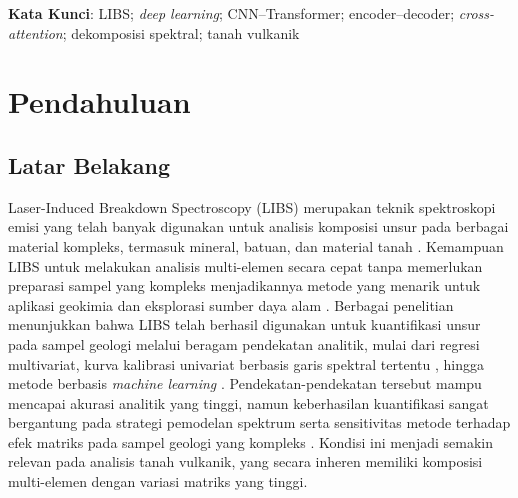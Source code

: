\documentclass[12pt, a4paper]{article}
\begin{document}
\vspace{0.3cm}
\noindent \textbf{Kata Kunci}: LIBS; \textit{deep learning}; CNN–Transformer; encoder–decoder; \textit{cross-attention}; dekomposisi spektral; tanah vulkanik

\newpage
\tableofcontents
\newpage

\section{Pendahuluan}

\subsection{Latar Belakang}
Laser-Induced Breakdown Spectroscopy (LIBS) merupakan teknik spektroskopi emisi yang telah banyak digunakan untuk analisis komposisi unsur pada berbagai material kompleks, termasuk mineral, batuan, dan material tanah \citep{legnaioli2025}. Kemampuan LIBS untuk melakukan analisis multi-elemen secara cepat tanpa memerlukan preparasi sampel yang kompleks menjadikannya metode yang menarik untuk aplikasi geokimia dan eksplorasi sumber daya alam \citep{sawyers2025}. Berbagai penelitian menunjukkan bahwa LIBS telah berhasil digunakan untuk kuantifikasi unsur pada sampel geologi melalui beragam pendekatan analitik, mulai dari regresi multivariat, kurva kalibrasi univariat berbasis garis spektral tertentu \citep{zhang2025}, hingga metode berbasis \textit{machine learning} \citep{babos2024, manzoor2025}. Pendekatan-pendekatan tersebut mampu mencapai akurasi analitik yang tinggi, namun keberhasilan kuantifikasi sangat bergantung pada strategi pemodelan spektrum serta sensitivitas metode terhadap efek matriks pada sampel geologi yang kompleks \citep{hao2024, manelski2024}. Kondisi ini menjadi semakin relevan pada analisis tanah vulkanik, yang secara inheren memiliki komposisi multi-elemen dengan variasi matriks yang tinggi.
\end{document}
